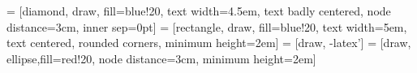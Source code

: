 \documentclass{article}
\begin{document}
\pagestyle{empty}


 = [diamond, draw, fill=blue!20, 
    text width=4.5em, text badly centered, node distance=3cm, inner sep=0pt]
 = [rectangle, draw, fill=blue!20, 
    text width=5em, text centered, rounded corners, minimum height=2em]
 = [draw, -latex']
 = [draw, ellipse,fill=red!20, node distance=3cm,
    minimum height=2em]
    
\end{document}
